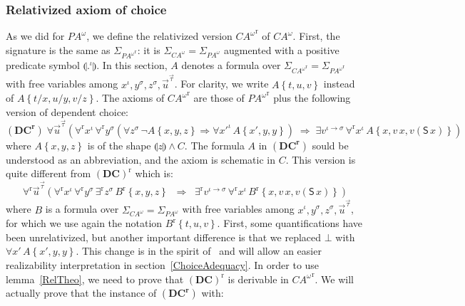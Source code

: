 \documentclass{CSML}
\newcommand*\SortTo\to
\newcommand*\SortA{\sigma}
\newcommand*\SortB{\tau}
\newcommand*\LogSortedTerm[2]{#1^{#2}}
\newcommand*\LogTermA{t}
\newcommand*\LogTermB{u}
\newcommand*\LogTermC{v}
\newcommand*\LogVarA{x}
\newcommand*\LogVarB{y}
\newcommand*\LogVarC{z}
\newcommand*\LogVarD{u}
\newcommand*\LogVarE{v}
\newcommand*\LogConst[1]{\mathsf{#1}}
\newcommand*\LogImp{\mathbin{\Rightarrow}}
\newcommand*\LogAnd{\mathbin{\wedge}}
\newcommand*\LogBot\bot
\newcommand*\LogRel[1]{\llparenthesis#1\rrparenthesis}
\newcommand*\LogRelForm[1]{{#1^\mathrm{r}}}
\newcommand*\LogForallRel{\forall^\mathrm{r}}
\newcommand*\LogExistsRel{\exists^\mathrm{r}}
\newcommand*\LogFormA{A}
\newcommand*\LogFormB{B}
\newcommand*\LogFormC{C}
\newcommand*\LogSubst[1]{\left\{#1\right\}}
\newcommand*\PA{{P\!A}}
\newcommand*\PAom{{\PA^\omega}}
\newcommand*\CA{{C\!A}}
\newcommand*\CAom{{\CA^\omega}}
\newcommand*\CASort\iota
\newcommand*\CALogS{\LogConst{S}}
\newcommand*\CAAxName[1]{{\bm{\scriptstyle(#1)}}}
\newcommand*\CADCUnrelName{\CAAxName{DC}}
\newcommand*\CADCName{\CAAxName{DC^r}}
\newcommand*\CADC[3]{\forall\LogSortedTerm{\vec{\LogVarD}}{\vec{#3}}\left(\LogForallRel\LogSortedTerm{\LogVarA}{\CASort}\,\LogForallRel\LogSortedTerm{\LogVarB}{#1}\left(\forall\LogSortedTerm{\LogVarC}{#1}\,\neg#2\LogSubst{\LogVarA,\LogVarB,\LogVarC}\LogImp\forall\LogSortedTerm{\LogVarA'}{\CASort}\,#2\LogSubst{\LogVarA',\LogVarB,\LogVarB}\right)\;\LogImp\;\exists\LogSortedTerm{\LogVarE}{\CASort\SortTo#1}\,\LogForallRel\LogSortedTerm{\LogVarA}{\CASort}\,#2\LogSubst{\LogVarA,\LogVarE\,\LogVarA,\LogVarE\left(\CALogS\,\LogVarA\right)}\right)}
\begin{document}
\subsubsection{Relativized axiom of choice}
\label{RelCAom}
As we did for $\PAom$, we define the relativized version $\LogRelForm{\CAom}$ of $\CAom$. First, the signature is the same as $\Sigma_\LogRelForm{\PAom}$: it is $\Sigma_\CAom=\Sigma_\PAom$ augmented with a positive predicate symbol $\LogRel{\LogSortedTerm{.}{\CASort}}$. In this section, $\LogFormA$ denotes a formula over $\Sigma_\LogRelForm{\CAom}=\Sigma_\LogRelForm{\PAom}$ with free variables among $\LogSortedTerm{\LogVarA}{\CASort},\LogSortedTerm{\LogVarB}{\SortA},\LogSortedTerm{\LogVarC}{\SortA},\LogSortedTerm{\vec{\LogVarD}}{\vec{\SortB}}$. For clarity, we write $\LogFormA\LogSubst{\LogTermA,\LogTermB,\LogTermC}$ instead of $\LogFormA\LogSubst{\LogTermA/\LogVarA,\LogTermB/\LogVarB,\LogTermC/\LogVarC}$. The axioms of $\LogRelForm{\CAom}$ are those of $\LogRelForm{\PAom}$ plus the following version of dependent choice:
$$\CADCName\;\CADC{\SortA}{\LogFormA}{\SortB}$$
where $\LogFormA\LogSubst{\LogVarA,\LogVarB,\LogVarC}$ is of the shape $\LogRel{\LogVarC}\LogAnd\LogFormC$. The formula $\LogFormA$ in $\CADCName$ sould be understood as an abbreviation, and the axiom is schematic in $\LogFormC$. This version is quite different from $\LogRelForm{\CADCUnrelName}$ which is:
$$\LogForallRel\LogSortedTerm{\vec{\LogVarD}}{\vec{\SortB}}\left(\LogForallRel\LogSortedTerm{\LogVarA}{\CASort}\,\LogForallRel\LogSortedTerm{\LogVarB}{\SortA}\,\LogExistsRel\LogSortedTerm{\LogVarC}{\SortA}\,\LogRelForm{\LogFormB}\LogSubst{\LogVarA,\LogVarB,\LogVarC}\;\;\LogImp\;\;\LogExistsRel\LogSortedTerm{\LogVarE}{\CASort\SortTo\SortA}\,\LogForallRel\LogSortedTerm{\LogVarA}{\CASort}\,\LogRelForm{\LogFormB}\LogSubst{\LogVarA,\LogVarE\,\LogVarA,\LogVarE\left(\CALogS\,\LogVarA\right)}\right)$$
where $\LogFormB$ is a formula over $\Sigma_\CAom=\Sigma_\PAom$ with free variables among $\LogSortedTerm{\LogVarA}{\CASort},\LogSortedTerm{\LogVarB}{\SortA},\LogSortedTerm{\LogVarC}{\SortA},\LogSortedTerm{\vec{\LogVarD}}{\vec{\SortB}}$, for which we use again the notation $\LogRelForm{\LogFormB}\LogSubst{\LogTermA,\LogTermB,\LogTermC}$. First, some quantifications have been unrelativized, but another important difference is that we replaced $\LogBot$ with $\forall\LogVarA'\,\LogFormA\LogSubst{\LogVarA',\LogVarB,\LogVarB}$. This change is in the spirit of~\cite{EscardoOlivaPeirce} and will allow an easier realizability interpretation in section~\ref{ChoiceAdequacy}. In order to use lemma~\ref{RelTheo}, we need to prove that $\LogRelForm{\CADCUnrelName}$ is derivable in $\LogRelForm{\CAom}$. We will actually prove that the instance of $\CADCName$ with:
\end{document}

